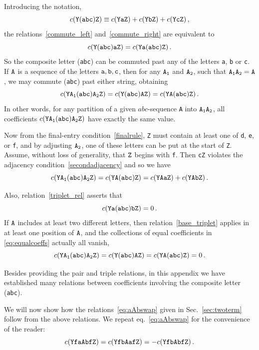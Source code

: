 \documentclass[12pt]{article}
\begin{document}
Introducing the notation,
\begin{equation}
c({\tt Y(abc) Z})\equiv c({\tt YaZ})+c({\tt YbZ})+c({\tt YcZ})\,,
\end{equation}
the relations~\eqref{commute_left} and~\eqref{commute_right} are equivalent to \begin{equation}
c({\tt Y(abc)aZ})=c({\tt Ya(abc)Z})\,.\label{commute}
\end{equation}
%
So the composite letter ({\tt abc}) can be commuted past any of the letters {\tt a}, {\tt b} or {\tt c}.  If $\tt A$ is a sequence of the letters $\tt a,b,c$, then for any $\tt A_1$ and $\tt A_2$, such that $\tt A_1A_2=A$, we may commute ({\tt abc}) past either string, obtaining
\begin{equation}
    c({\tt YA_1(abc)A_2Z}) = c({\tt Y(abc)AZ}) = c({\tt YA(abc)Z})\,.
    \label{eq:equalcoeffs}
\end{equation}
%
In other words, for any partition of a given $abc$-sequence {\tt A} into ${\tt A_1A_2}$, all coefficients $c({\tt YA_1(abc)A_2Z})$ have exactly the same value.

Now from the final-entry condition~\ref{finalrule}, {\tt Z} must contain at least one of {\tt d}, {\tt e}, or {\tt f}, and by adjusting ${\tt A_2}$, one of these letters can be put at the start of {\tt Z}. Assume, without loss of generality, that $\tt Z$ begins with {\tt f}.  Then {\tt cZ} violates the adjacency condition~\ref{secondadjacency} and so we have 
\begin{equation}
    c({\tt YA_1(abc)A_2Z})=c({\tt YA(abc)Z})= c({\tt YAaZ})+c({\tt YAbZ})\,.
\end{equation}

Also, relation~\eqref{triplet_rel} asserts that
\begin{equation}
c({\tt Ya(abc)bZ})=0\,. \label{base_triplet}
\end{equation}
If $\tt A$ includes at least two different letters, then relation~\eqref{base_triplet} applies in at least one position of $\tt A$, and the collections of equal coefficients in \eqref{eq:equalcoeffs} actually all vanish, 
\begin{equation}
    c({\tt YA_1(abc)A_2Z}) = c({\tt Y(abc)AZ}) = c({\tt YA(abc)Z}) = 0\,.
\end{equation}

Besides providing the pair and triple relations, in this appendix we have established many relations between coefficients involving the composite letter ({\tt abc}).

We will now show how the relations~\eqref{eq:aAbswap} given in 
Sec.~\ref{sec:twoterm} follow from the above relations. We repeat eq.~\eqref{eq:aAbswap} for the convenience of the reader:
\begin{equation}
c({\tt YfaAbfZ}) = c({\tt YfbAafZ}) = -c({\tt YfbAbfZ})\,.
\label{eq:aAbswap-app}
\end{equation}
\end{document}
